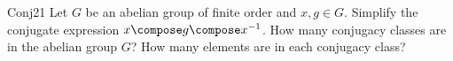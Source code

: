 %

%
%
%

\begin{exercise}{Conj21}
Let $G$ be an abelian group of finite order and $x,g\in G$.
Simplify the conjugate expression $x\compose g\compose x^{-1}$.  How many conjugacy classes are in the abelian group $G$? How many elements are in each conjugacy class? 
\end{exercise}



